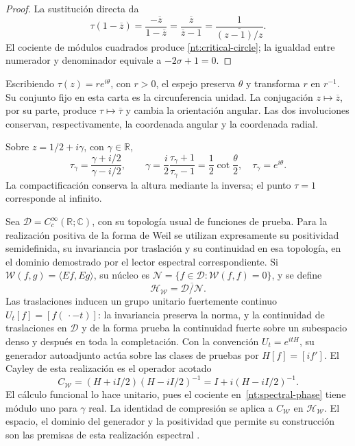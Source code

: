 \documentclass[a4paper,10pt]{article}
\theoremstyle{definition}\newtheorem{definition}[theorem]{Definición}
\theoremstyle{remark}\newtheorem{remark}[theorem]{Observación}
\numberwithin{equation}{section}
\begin{document}
\begin{proof}
La sustitución directa da
\[
 \tau(1-\overline z)
 =\frac{-\overline z}{1-\overline z}
 =\frac{\overline z}{\overline z-1}
 =\frac1{\overline{(z-1)/z}}.
\]
El cociente de módulos cuadrados produce
\eqref{nt:critical-circle}; la igualdad entre numerador y
denominador equivale a \(-2\sigma+1=0\).
\end{proof}

Escribiendo \(\tau(z)=r e^{i\theta}\), con \(r>0\), el
espejo preserva \(\theta\) y transforma \(r\) en \(r^{-1}\).
Su conjunto fijo en esta carta es la circunferencia unidad.
La conjugación \(z\mapsto\overline z\), por su parte,
produce \(\tau\mapsto\overline\tau\) y cambia la orientación
angular. Las dos involuciones conservan, respectivamente,
la coordenada angular y la coordenada radial.

Sobre \(z=1/2+i\gamma\), con \(\gamma\in\mathbb R\),
\begin{equation}
 \tau_\gamma=\frac{\gamma+i/2}{\gamma-i/2},
 \qquad
 \gamma=\frac{i}{2}\frac{\tau_\gamma+1}{\tau_\gamma-1}
       =\frac12\cot\frac{\theta}{2},
 \quad \tau_\gamma=e^{i\theta}.
 \label{nt:spectral-phase}
\end{equation}
La compactificación conserva la altura mediante la inversa;
el punto \(\tau=1\) corresponde al infinito.

Sea \(\mathcal D=C_c^\infty(\mathbb R;\mathbb C)\), con su topología
usual de funciones de prueba. Para la realización positiva de la forma
de Weil se utilizan expresamente su positividad semidefinida, su
invariancia por traslación y su continuidad en esa topología, en el
dominio demostrado por el lector espectral correspondiente. Si
\(\mathscr W(f,g)=\langle Ef,Eg\rangle\), su núcleo es
\(\mathcal N=\{f\in\mathcal D:\mathscr W(f,f)=0\}\), y se define
\[
 \mathcal H_{\mathscr W}
 =\overline{\mathcal D/\mathcal N}.
\]
Las traslaciones inducen un grupo unitario fuertemente
continuo \(U_t[f]=[f(\,\cdot-t)]\): la invariancia preserva la norma,
y la continuidad de traslaciones en \(\mathcal D\) y de la forma
prueba la continuidad fuerte sobre un subespacio denso y después en
toda la completación. Con la convención
\(U_t=e^{itH}\), su generador autoadjunto actúa sobre
las clases de pruebas por \(H[f]=[if']\). El Cayley de
esta realización es el operador acotado
\begin{equation}
 C_{\mathscr W}
 =(H+iI/2)(H-iI/2)^{-1}
 =I+i(H-iI/2)^{-1}.
 \label{nt:cayley-hilbert}
\end{equation}
El cálculo funcional lo hace unitario, pues el cociente
en~\eqref{nt:spectral-phase} tiene módulo uno para
\(\gamma\) real. La identidad de compresión se aplica
a \(C_{\mathscr W}\) en \(\mathcal H_{\mathscr W}\).
El espacio, el dominio del generador y la positividad
que permite su construcción son las premisas de esta
realización espectral \cite{HMT-VIII}.
\end{document}
